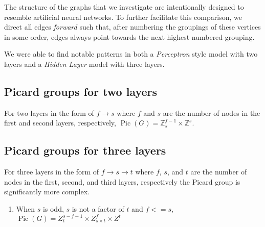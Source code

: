 \documentclass[11pt,reqno]{amsart}
\DeclareMathOperator{\Pic}{Pic}
\theoremstyle{definition}
\theoremstyle{plain}
\begin{document}
	The structure of the graphs that we investigate are intentionally designed to resemble artificial neural networks.
	To further facilitate this comparison, we direct all edges \textit{forward} such that, after numbering the groupings
	of these vertices in some order, edges always point towards the next highest numbered grouping.

	We were able to find notable patterns in both a \textit{Perceptron} style model with two layers and a
	\textit{Hidden Layer} model with three layers.

	\subsection{Picard groups for two layers}
		For two layers in the form of $f \rightarrow s$ where $f$ and $s$ are the number of nodes in the first and
		second layers, respectively, $\Pic(G) = \mathbb{Z}_{s}^{f-1} \times \mathbb{Z}^s$.

	\subsection{Picard groups for three layers}
		For three layers in the form of $f \rightarrow s \rightarrow t$ where $f$, $s$, and $t$ are the number of nodes
		in the first, second, and third layers, respectively the Picard group is significantly more complex.

		\begin{enumerate}
			\item When $s$ is odd, $s$ is not a factor of $t$ and $f <= s$,
				$\Pic(G) = Z_{t}^{s-f-1} \times Z_{s \times t}^{f} \times Z^t$
		\end{enumerate}

%
\end{document}
